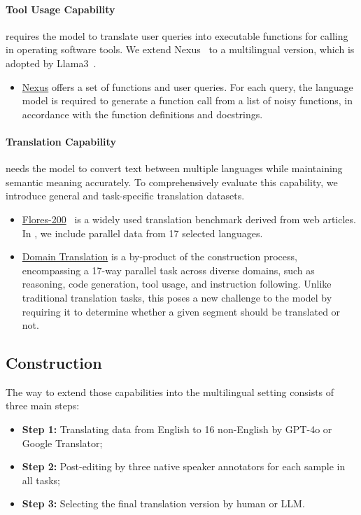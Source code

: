 \paragraph{Tool Usage Capability} requires the model to translate user queries into executable functions for calling in operating software tools. We extend Nexus~\cite{srinivasan2023nexusraven} to a multilingual version, which is adopted by Llama3~\cite{dubey2024llama}. 
\begin{itemize}[nosep,itemsep=1pt,leftmargin=0.1cm]
    \item \underline{Nexus} offers a set of functions and user queries. For each query, the language model is required to generate a function call from a list of noisy functions, in accordance with the function definitions and docstrings. 
\end{itemize}


\paragraph{Translation Capability} needs the model to convert text between multiple languages while maintaining semantic meaning accurately. To comprehensively evaluate this capability, we introduce general and task-specific translation datasets.
\begin{itemize}[nosep,itemsep=1pt,leftmargin=0.1cm]
    \item \underline{Flores-200}~\cite{costa2022no} is a widely used translation benchmark derived from web articles. In \name, we include parallel data from 17 selected languages.
    \item \underline{Domain Translation} is a by-product of the \name construction process, encompassing a 17-way parallel task across diverse domains, such as reasoning, code generation, tool usage, and instruction following. Unlike traditional translation tasks, this poses a new challenge to the model by requiring it to determine whether a given segment should be translated or not.
\end{itemize}



\subsection{Construction}
\label{sec:construction_process}

The way to extend those capabilities into the multilingual setting consists of three main steps: 
\begin{itemize}[nosep,itemsep=1pt,leftmargin=0.1cm]
\item \textbf{Step 1:} Translating data from English to 16 non-English by GPT-4o or Google Translator; 
\item \textbf{Step 2:} Post-editing by three native speaker annotators for each sample in all tasks; 
\item \textbf{Step 3:} Selecting the final translation version by human or LLM. 
\end{itemize}

